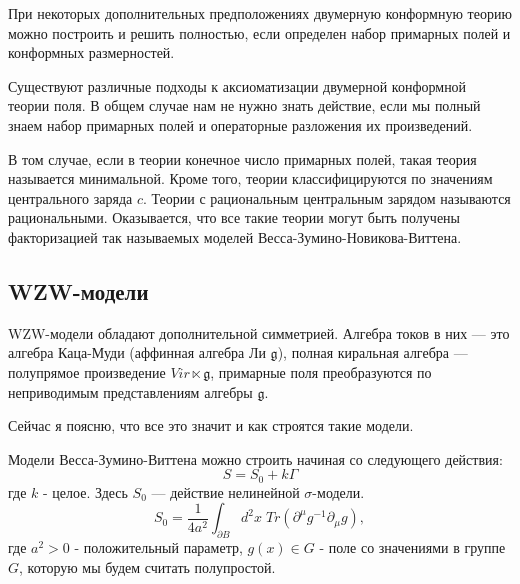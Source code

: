 \documentclass[a4paper,12pt]{article}
\theoremstyle{definition} \newtheorem{Def}{Definition}
\begin{document}
При некоторых дополнительных предположениях двумерную конформную теорию можно построить и решить
полностью, если определен набор примарных полей и конформных размерностей. 

Существуют различные подходы к аксиоматизации двумерной конформной теории поля. В общем случае нам
не нужно знать действие, если мы полный знаем набор примарных полей и операторные разложения их
произведений. 

В том случае, если в теории конечное число примарных полей, такая теория называется минимальной.
Кроме того, теории классифицируются по значениям центрального заряда $c$. Теории с рациональным
центральным зарядом называются рациональными. Оказывается, что все такие теории могут быть получены
факторизацией так называемых моделей Весса-Зумино-Новикова-Виттена.

\subsection{WZW-модели}
\label{sec:wzw}

WZW-модели обладают дополнительной симметрией. Алгебра токов в них --- это алгебра Каца-Муди
(аффинная алгебра Ли $\mathfrak{g}$), полная киральная алгебра --- полупрямое произведение
$Vir\ltimes \mathfrak{g}$, примарные поля преобразуются по неприводимым представлениям алгебры $\mathfrak{g}$.

Сейчас я поясню, что все это значит и как строятся такие модели.

Модели Весса-Зумино-Виттена можно строить начиная со следующего действия:
\begin{equation}
\label{eq:4}
  S=S_0+k\Gamma
\end{equation}
где $k$ - целое.
Здесь $S_0$ --- действие нелинейной $\sigma$-модели.
\begin{equation}
  \label{eq:5}
  S_0=\frac{1}{4a^2}\int_{\partial B} d^2x\; Tr (\partial^{\mu}g^{-1}\partial_{\mu}g),
\end{equation}
где $a^2>0$ - положительный параметр, $g(x)\in G$ - поле со значениями в группе $G$, которую мы
будем считать полупростой. 
\end{document}
